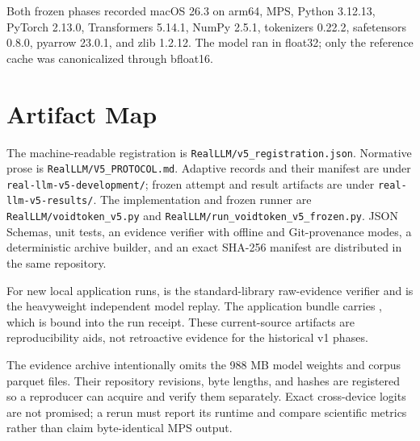 \documentclass[10pt,twocolumn]{article}
\begin{document}
Both frozen phases recorded macOS 26.3 on arm64, MPS, Python 3.12.13,
PyTorch 2.13.0, Transformers 5.14.1, NumPy 2.5.1, tokenizers 0.22.2,
safetensors 0.8.0, pyarrow 23.0.1, and zlib 1.2.12. The model ran in float32;
only the reference cache was canonicalized through bfloat16.

\section{Artifact Map}
\label{app:artifact}

The machine-readable registration is
\texttt{RealLLM/v5\_registration.json}. Normative prose is
\texttt{RealLLM/V5\_PROTOCOL.md}. Adaptive records and their manifest are under
\texttt{real-llm-v5-development/}; frozen attempt and result artifacts are
under \texttt{real-llm-v5-results/}. The implementation and frozen runner are
\texttt{RealLLM/voidtoken\_v5.py} and
\texttt{RealLLM/run\_voidtoken\_v5\_frozen.py}. JSON Schemas, unit tests, an
evidence verifier with offline and Git-provenance modes, a deterministic
archive builder, and an exact SHA-256 manifest are distributed in the same
repository.

For new local application runs,  is
the standard-library raw-evidence verifier and
 is the heavyweight independent model
replay. The application bundle carries ,
which is bound into the run receipt. These current-source artifacts are
reproducibility aids, not retroactive evidence for the historical v1 phases.

The evidence archive intentionally omits the 988 MB model weights and corpus
parquet files. Their repository revisions, byte lengths, and hashes are
registered so a reproducer can acquire and verify them separately. Exact
cross-device logits are not promised; a rerun must report its runtime and
compare scientific metrics rather than claim byte-identical MPS output.
\end{document}
